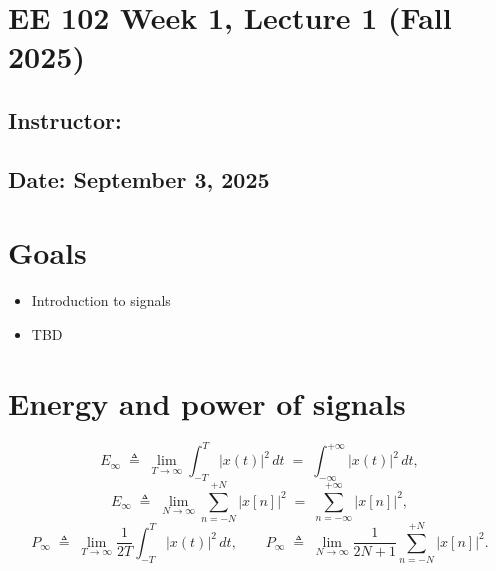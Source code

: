 \documentclass{ee102_notes}
\renewcommand{\releasedate}{September 3, 2025}
\begin{document}
\section*{EE 102 Week 1, Lecture 1 (Fall 2025)}
\subsection*{Instructor: \instructor}
\subsection*{Date: \releasedate}
\section{Goals}
\begin{itemize}
  \item Introduction to signals
  \item TBD
\end{itemize}

\section{Energy and power of signals}

\[
E_{\infty} \;\triangleq\; \lim_{T\to\infty}\int_{-T}^{T}\! |x(t)|^{2}\,dt 
\;=\; \int_{-\infty}^{+\infty}\! |x(t)|^{2}\,dt,
\]
\[
E_{\infty} \;\triangleq\; \lim_{N\to\infty}\sum_{n=-N}^{+N} |x[n]|^{2}
\;=\; \sum_{n=-\infty}^{+\infty} |x[n]|^{2},
\]
\[
P_{\infty} \;\triangleq\; \lim_{T\to\infty} \frac{1}{2T}\int_{-T}^{T}\! |x(t)|^{2}\,dt,
\qquad
P_{\infty} \;\triangleq\; \lim_{N\to\infty} \frac{1}{2N+1}\sum_{n=-N}^{+N} |x[n]|^{2}.
\]
\end{document}
